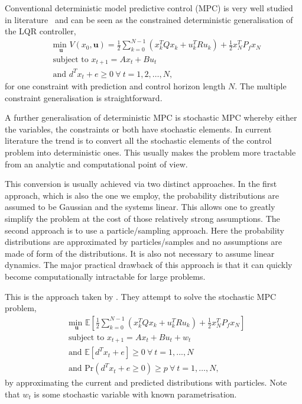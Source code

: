 Conventional deterministic model predictive control (MPC) is very well studied in literature~\cite{raw} and can be seen as the constrained deterministic generalisation of the LQR controller,
\begin{equation}
\begin{aligned}
&\underset{\mathbf{u}}{\text{min }} V(x_0, \mathbf{u}) = \frac{1}{2}\sum_{k=0}^{N-1} \left( x_k^TQx_k + u_k^TRu_k \right) + \frac{1}{2}x_N^TP_fx_N \\
& \text{subject to } x_{t+1} = Ax_t+Bu_t \\
& \text{and } d^Tx_t + e \geq 0 ~\forall~t=1, 2,\hdots,N,
\end{aligned}
\label{eq_lit_mpc}
\end{equation}
for one constraint with prediction and control horizon length $N$. The multiple constraint generalisation is straightforward.

A further generalisation of deterministic MPC is stochastic MPC whereby either the variables, the constraints or both have stochastic elements. In current literature the trend is to convert all the stochastic elements of the control problem into deterministic ones. This usually makes the problem more tractable from an analytic and computational point of view.

This conversion is usually achieved via two distinct approaches. In the first approach, which is also the one we employ, the probability distributions are assumed to be Gaussian and the systems linear. This allows one to greatly simplify the problem at the cost of those relatively strong assumptions. The second approach is to use a particle/sampling approach. Here the probability distributions are approximated by particles/samples and no assumptions are made of form of the distributions. It is also not necessary to assume linear dynamics. The major practical drawback of this approach is that it can quickly become computationally intractable for large problems.

This is the approach taken by \cite{blackmore}. They attempt to solve the stochastic MPC problem, 
\begin{equation}
\begin{aligned}
&\underset{\mathbf{u}}{\text{min }} \mathbb{E}\left[ \frac{1}{2}\sum_{k=0}^{N-1} \left( x_k^TQx_k + u_k^TRu_k \right) + \frac{1}{2}x_N^TP_fx_N \right] \\
& \text{subject to } x_{t+1}=Ax_t+Bu_t + w_t \\
& \text{and } \mathbb{E}[d^Tx_t + e] \geq 0 ~\forall ~t=1,...,N \\
& \text{and } \text{Pr}(d^Tx_t + e \geq 0) \geq p ~\forall ~t=1,\hdots,N,
\end{aligned}
\label{eq_lit_chance_mpc_state}
\end{equation}
by approximating the current and predicted distributions with particles. Note that $w_t$ is some stochastic variable with known parametrisation.


